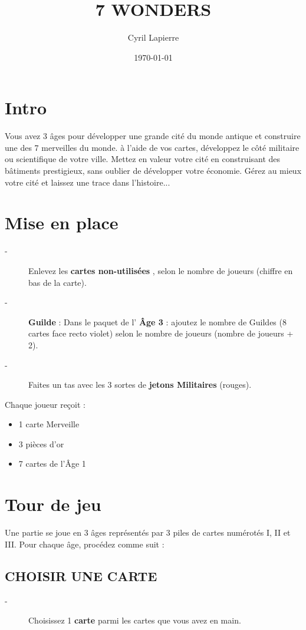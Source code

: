 \documentclass{article}%
\title{7 WONDERS}%
\author{Cyril Lapierre}%
\date{\today}%
\begin{document}
%
\normalsize%
\maketitle\thispagestyle{header}%
\pagestyle{header}%
\section{ Intro
}%
\label{sec:Intro}%
Vous avez 3 âges pour développer une grande cité du monde antique et construire une des 7 merveilles du
%
monde. à l’aide de vos cartes, développez le côté militaire ou scientifique de votre ville. Mettez en valeur
%
votre cité en construisant des bâtiments prestigieux, sans oublier de développer votre économie.
%
Gérez au mieux votre cité et laissez une trace dans l'histoire...


%
\section{ Mise en place
}%
\label{sec:Miseenplace}%
\begin{description}%
\item[{-} ]%
%
 Enlevez les %
\textbf{cartes non{-}utilisées}%
, selon le nombre de joueurs (chiffre en bas de la carte).
%
\item[{-} ]%
%
\textbf{Guilde}%
\textit{ }%
 : Dans le paquet de l'%
\textbf{Âge 3}%
\textit{ }%
 : ajoutez le nombre de Guildes (8 cartes face recto violet) selon le nombre de joueurs (nombre de joueurs + 2).
%
\item[{-} ]%
%
 Faites un tas avec les 3 sortes de %
\textbf{jetons Militaires}%
\textit{ }%
 (rouges).
%
\end{description}%
Chaque joueur reçoit :
%
\begin{itemize}%
\item%
%
 1 carte Merveille
%
\item%
%
 3 pièces d’or
%
\item%
%
 7 cartes de l'Âge 1
%
\end{itemize}

%
\section{ Tour de jeu
}%
\label{sec:Tourdejeu}%
Une partie se joue en 3 âges représentés par 3 piles de cartes numérotés I, II et III. Pour chaque âge, procédez comme suit :


%
\subsection{ CHOISIR UNE CARTE
}%
\label{subsec:CHOISIRUNECARTE}%
\begin{description}%
\item[{-} ]%
%
 Choisissez 1 %
\textbf{carte}%
\textit{ }%
 parmi les cartes que vous avez en main.
%
\end{description}
\end{document}
